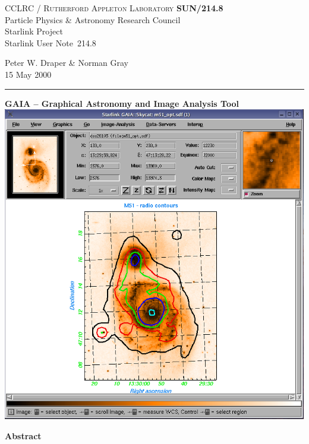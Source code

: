 \documentclass[twoside,11pt]{article}
\newcommand{\stardoccategory}  {Starlink User Note}
\newcommand{\stardocinitials}  {SUN}
\newcommand{\stardocnumber}    {214.8}
\newcommand{\stardocauthors}   {Peter W. Draper \& Norman Gray}
\newcommand{\stardocdate}      {15 May 2000}
\newcommand{\stardoctitle}     {GAIA -- Graphical Astronomy and
                                Image Analysis Tool}
\newcommand{\stardocname}{\stardocinitials /\stardocnumber}
\newenvironment{latexonly}{}{}
\renewcommand{\_}{\texttt{\symbol{95}}}
\begin{document}
\thispagestyle{empty}

\begin{latexonly}
   CCLRC / \textsc{Rutherford Appleton Laboratory} \hfill \textbf{\stardocname}\\
   {\large Particle Physics \& Astronomy Research Council}\\
   {\large Starlink Project\\}
   {\large \stardoccategory\ \stardocnumber}
   \begin{flushright}
   \stardocauthors\\
   \stardocdate
   \end{flushright}
   \vspace{-4mm}
   \rule{\textwidth}{0.5mm}
   \vspace{5mm}
   \begin{center}
   {\Large\textbf{\stardoctitle \\ [2.5ex]}}
   \vspace{5mm}
   \includegraphics[totalheight=5in]{sun214fig.ps}
   \end{center}

   \begin{center}
      {\Large\textbf{Abstract}}
   \end{center}
\end{latexonly}
\end{document}

